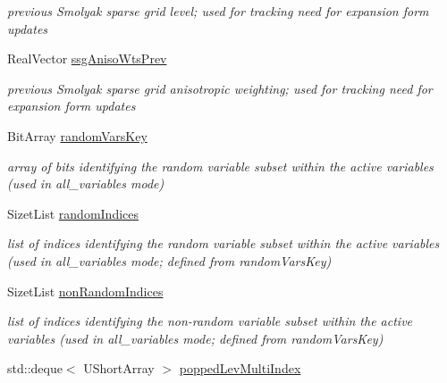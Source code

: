\begin{DoxyCompactItemize}
\begin{DoxyCompactList}\small\item\em previous Smolyak sparse grid level; used for tracking need for expansion form updates \end{DoxyCompactList}\item 
Real\+Vector \hyperlink{classPecos_1_1SharedPolyApproxData_a95a815408af4f5fd9411e42c99b21d81}{ssg\+Aniso\+Wts\+Prev}\label{classPecos_1_1SharedPolyApproxData_a95a815408af4f5fd9411e42c99b21d81}

\begin{DoxyCompactList}\small\item\em previous Smolyak sparse grid anisotropic weighting; used for tracking need for expansion form updates \end{DoxyCompactList}\item 
Bit\+Array \hyperlink{classPecos_1_1SharedPolyApproxData_a00f8835f3e7b239aa51b1347ee840031}{random\+Vars\+Key}\label{classPecos_1_1SharedPolyApproxData_a00f8835f3e7b239aa51b1347ee840031}

\begin{DoxyCompactList}\small\item\em array of bits identifying the random variable subset within the active variables (used in all\+\_\+variables mode) \end{DoxyCompactList}\item 
Sizet\+List \hyperlink{classPecos_1_1SharedPolyApproxData_ac66f510b7b3460b8a813114faa0ce800}{random\+Indices}\label{classPecos_1_1SharedPolyApproxData_ac66f510b7b3460b8a813114faa0ce800}

\begin{DoxyCompactList}\small\item\em list of indices identifying the random variable subset within the active variables (used in all\+\_\+variables mode; defined from random\+Vars\+Key) \end{DoxyCompactList}\item 
Sizet\+List \hyperlink{classPecos_1_1SharedPolyApproxData_adcc40981a7da46d9dfee5dd7c31f4fd7}{non\+Random\+Indices}\label{classPecos_1_1SharedPolyApproxData_adcc40981a7da46d9dfee5dd7c31f4fd7}

\begin{DoxyCompactList}\small\item\em list of indices identifying the non-\/random variable subset within the active variables (used in all\+\_\+variables mode; defined from random\+Vars\+Key) \end{DoxyCompactList}\item 
std\+::deque$<$ U\+Short\+Array $>$ \hyperlink{classPecos_1_1SharedPolyApproxData_add68313822a35cf8aced2a0d35814449}{popped\+Lev\+Multi\+Index}\label{classPecos_1_1SharedPolyApproxData_add68313822a35cf8aced2a0d35814449}


\end{DoxyCompactItemize}
